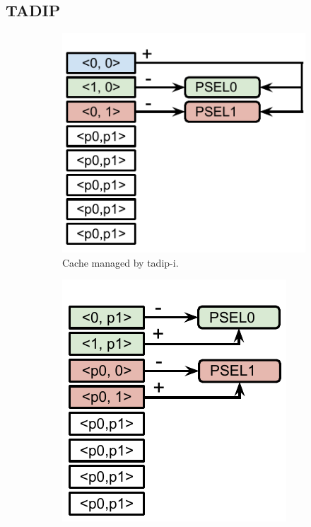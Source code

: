 \subsection{TADIP}
\label{sec:algorithms:tadip}

\begin{figure}[H]
    \centering
    \begin{subfigure}[b]{0.45\textwidth}
        \includegraphics[width=\textwidth]{figures/algorithms/TADIP-I}
        \caption{Cache managed by \gls{tadip-i}.}
        \label{fig:algorithms:tadip:isolated}
    \end{subfigure}
    \begin{subfigure}[b]{0.45\textwidth}
        \includegraphics[width=\textwidth]{figures/algorithms/TADIP-F}

\end{subfigure}
\end{figure}
